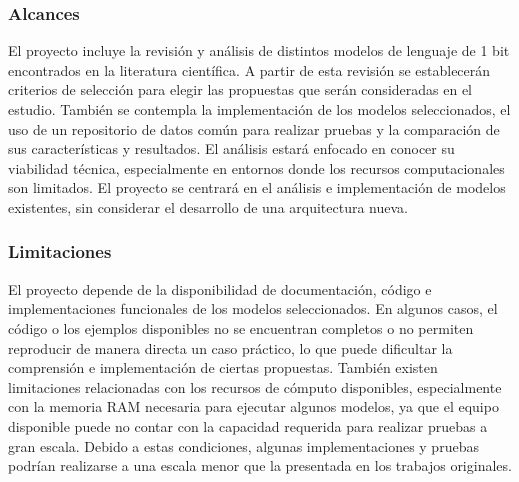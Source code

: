 \subsubsection{Alcances} \label{subsec:alcances}

El proyecto incluye la revisión y análisis de distintos modelos de lenguaje de 1 bit encontrados en la literatura científica. A partir de esta revisión se establecerán criterios de selección para elegir las propuestas que serán consideradas en el estudio. También se contempla la implementación de los modelos seleccionados, el uso de un repositorio de datos común para realizar pruebas y la comparación de sus características y resultados. El análisis estará enfocado en conocer su viabilidad técnica, especialmente en entornos donde los recursos computacionales son limitados. El proyecto se centrará en el análisis e implementación de modelos existentes, sin considerar el desarrollo de una arquitectura nueva.

\subsubsection{Limitaciones} \label{subsec:limitaciones}

El proyecto depende de la disponibilidad de documentación, código e implementaciones funcionales de los modelos seleccionados. En algunos casos, el código o los ejemplos disponibles no se encuentran completos o no permiten reproducir de manera directa un caso práctico, lo que puede dificultar la comprensión e implementación de ciertas propuestas. También existen limitaciones relacionadas con los recursos de cómputo disponibles, especialmente con la memoria RAM necesaria para ejecutar algunos modelos, ya que el equipo disponible puede no contar con la capacidad requerida para realizar pruebas a gran escala. Debido a estas condiciones, algunas implementaciones y pruebas podrían realizarse a una escala menor que la presentada en los trabajos originales.
